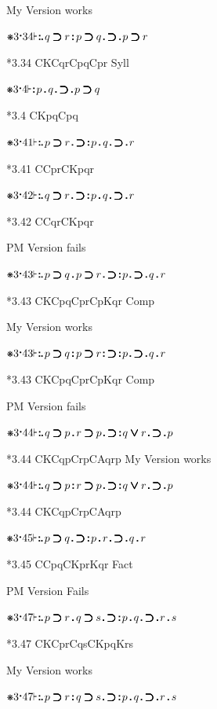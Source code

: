 \documentclass[12pt]{article}
\newcommand{\pmthm}{\mathpunct{\text{\scalebox{.5}[1]{$\boldsymbol\vdash$}}}} %
\newcommand{\pmast}{\text{\resizebox{!}{.75\height}{\ding{107}}}} %
\newcommand{\pmcdot}{\text{\raisebox{.05cm}{$\boldsymbol\cdot$}}} %
\newcommand{\pmd}{\hbox{\rule{.3ex}{.3ex}}} %
\newcommand{\pmdd}{\overset{\pmd}{\pmd}} %
\newcommand{\pmdot}{\mathinner{\pmd}}
\newcommand{\pmdott}{\mathinner{\pmdd}}
\newcommand{\pmdottt}{\mathinner{\pmdd\hspace{1pt}\pmd}}
\newcommand{\pmor}{\mathbin{\ooalign{$\boldsymbol{\vee}\mkern.5mu$\hidewidth\cr$\boldsymbol{\vee}$\cr\hidewidth$\mkern.5mu\boldsymbol{\vee}$}}}
\newcommand{\pmimp}{\mathbin{\ooalign{$\boldsymbol{\supset}\mkern.5mu$\hidewidth\cr$\boldsymbol{\supset}$\cr\hidewidth$\mkern.5mu\boldsymbol{\supset}$}}} %
\newcommand{\pmand}{\mathbin{\pmd}}%
\newcommand{\pmandd}{\mathbin{\pmdd}}
\begin{document}
My Version works

$\pmast 3 \pmcdot 34 \pmthm \pmdottt q \pmimp r \pmandd p \pmimp q \pmdot \pmimp \pmdot p \pmimp r   $

*3.34 CKCqrCpqCpr Syll

$\pmast 3 \pmcdot 4 \pmthm \pmdott p \pmand q \pmdot \pmimp \pmdot p \pmimp q $

*3.4 CKpqCpq

$\pmast 3 \pmcdot 41 \pmthm \pmdottt p \pmimp r \pmdot \pmimp \pmdott p \pmand q \pmdot \pmimp \pmdot r    $

*3.41 CCprCKpqr

$\pmast 3 \pmcdot 42 \pmthm \pmdottt q \pmimp r \pmdot \pmimp \pmdott p \pmand q \pmdot \pmimp \pmdot r    $

*3.42 CCqrCKpqr

PM Version fails

$\pmast 3 \pmcdot 43 \pmthm \pmdottt p \pmimp q \pmand p \pmimp r \pmdot \pmimp  \pmdott p \pmdot \pmimp \pmdot q \pmand r  $

*3.43 CKCpqCprCpKqr Comp

My Version works

$\pmast 3 \pmcdot 43 \pmthm \pmdottt p \pmimp q \pmandd p \pmimp r \pmdott \pmimp  \pmdott p \pmdot \pmimp \pmdot q \pmand r  $

*3.43 CKCpqCprCpKqr Comp

PM Version fails

$\pmast 3 \pmcdot 44 \pmthm \pmdottt q \pmimp p \pmand r \pmimp p \pmdot \pmimp  \pmdott q \pmor r \pmdot \pmimp \pmdot p   $

*3.44 CKCqpCrpCAqrp
My Version works

$\pmast 3 \pmcdot 44 \pmthm \pmdottt q \pmimp p \pmandd r \pmimp p \pmdot \pmimp  \pmdott q \pmor r \pmdot \pmimp \pmdot p   $

*3.44 CKCqpCrpCAqrp

$\pmast 3 \pmcdot 45 \pmthm \pmdottt p \pmimp q \pmdot \pmimp \pmdott p \pmand r \pmdot \pmimp \pmdot q \pmand  r    $

*3.45 CCpqCKprKqr Fact

PM Version Fails

$\pmast 3 \pmcdot 47 \pmthm \pmdottt p \pmimp r \pmand q \pmimp s \pmdot \pmimp \pmdott p \pmand q \pmdot \pmimp \pmdot r \pmand s $

*3.47 CKCprCqsCKpqKrs

My Version works

$\pmast 3 \pmcdot 47 \pmthm \pmdottt p \pmimp r \pmandd q \pmimp s \pmdot \pmimp \pmdott p \pmand q \pmdot \pmimp \pmdot r \pmand s $
\end{document}
